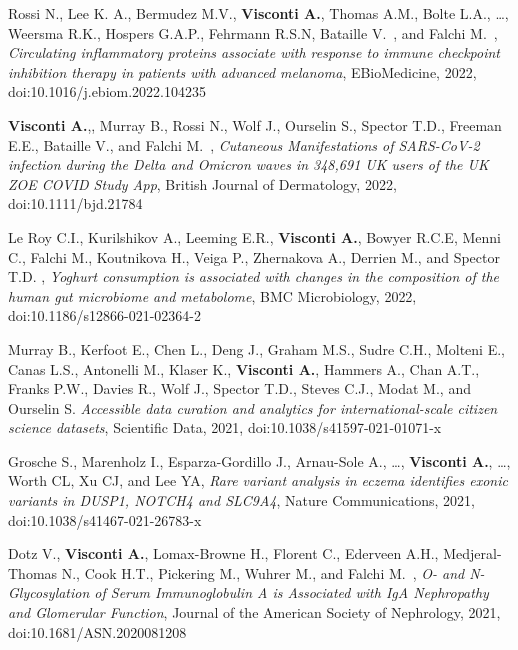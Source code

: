 \begin{itemize}
	  Rossi N.\cofirst, Lee K. A.\cofirst, Bermudez M.V., \textbf{Visconti A.}, Thomas A.M., Bolte L.A., \dots, Weersma R.K., Hospers G.A.P., Fehrmann R.S.N, Bataille V.\colast ~\corresponding, and Falchi M.\colast ~\corresponding, \emph{Circulating inflammatory proteins associate with response to immune checkpoint inhibition therapy in patients with advanced melanoma}, EBioMedicine, 2022, doi:10.1016/j.ebiom.2022.104235 %

		
		\textbf{Visconti A.}\cofirst,, Murray B.\cofirst, Rossi N., Wolf J., Ourselin S., Spector T.D., Freeman E.E., Bataille V.\colast, and Falchi M.\colast ~\corresponding, \emph{Cutaneous Manifestations of SARS-CoV-2 infection during the Delta and Omicron waves in 348,691 UK users of the UK ZOE COVID Study App}, British Journal of Dermatology, 2022, doi:10.1111/bjd.21784 
		
		 Le Roy C.I., Kurilshikov A., Leeming E.R., \textbf{Visconti A.}, Bowyer R.C.E, Menni C., Falchi M., Koutnikova H., Veiga P., Zhernakova A., Derrien M.\corresponding, and Spector T.D. \corresponding, \emph{Yoghurt consumption is associated with changes in the composition of the human gut microbiome and metabolome}, BMC Microbiology, 2022, doi:10.1186/s12866-021-02364-2 %

		 Murray B.\corresponding, Kerfoot E., Chen L., Deng J., Graham M.S., Sudre C.H., Molteni E., Canas L.S., Antonelli M., Klaser K., \textbf{Visconti A.}, Hammers A., Chan A.T., Franks P.W., Davies R., Wolf J., Spector T.D., Steves C.J., Modat M., and Ourselin S. \emph{Accessible data curation and analytics for international-scale citizen science datasets}, Scientific Data, 2021, doi:10.1038/s41597-021-01071-x %
		
		  Grosche S.\cofirst, Marenholz I.\cofirst, Esparza-Gordillo J.\cofirst, Arnau-Sole A.\cofirst, \dots, \textbf{Visconti A.}, \dots, Worth CL, Xu CJ, and Lee YA\corresponding, \emph{Rare variant analysis in eczema identifies exonic variants in DUSP1, NOTCH4 and SLC9A4}, Nature Communications, 2021, doi:10.1038/s41467-021-26783-x %

		 Dotz V.\cofirst, \textbf{Visconti A.}\cofirst, Lomax-Browne H.\cofirst, Florent C.\cofirst, Ederveen A.H., Medjeral-Thomas N., Cook H.T., Pickering M.,  Wuhrer M.\colast, and Falchi M.\colast ~\corresponding, \emph{O- and N-Glycosylation of Serum Immunoglobulin A is Associated with IgA Nephropathy and Glomerular Function}, Journal of the American Society of Nephrology, 2021, doi:10.1681/ASN.2020081208  %


\end{itemize}
